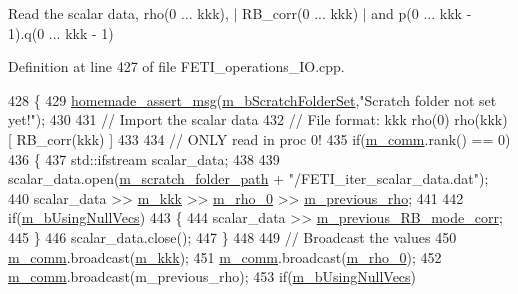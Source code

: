 Read the scalar data, {\ttfamily rho(0 ... kkk)}, {\ttfamily $\vert$ R\+B\+\_\+corr(0 ... kkk) $\vert$} and {\ttfamily p(0 ... kkk -\/ 1).q(0 ... kkk -\/ 1)} 



Definition at line 427 of file F\+E\+T\+I\+\_\+operations\+\_\+\+I\+O.\+cpp.


\begin{DoxyCode}
428 \{
429     \hyperlink{common__header_8h_a593ccc80b790b2268653fcf6597bf451}{homemade\_assert\_msg}(\hyperlink{classcarl_1_1_f_e_t_i___operations_a8bb9de7de35a2f7d7d5982ae1085ba15}{m\_bScratchFolderSet},\textcolor{stringliteral}{"Scratch folder not set
       yet!"});
430 
431     \textcolor{comment}{// Import the scalar data}
432     \textcolor{comment}{// File format:  kkk   rho(0)   rho(kkk)   [ RB\_corr(kkk) ]}
433 
434     \textcolor{comment}{// ONLY read in proc 0!}
435     \textcolor{keywordflow}{if}(\hyperlink{classcarl_1_1_f_e_t_i___operations_a8cb0ed286667fc9f3ebc2d8ef2a3e13b}{m\_comm}.rank() == 0)
436     \{
437         std::ifstream scalar\_data;
438 
439         scalar\_data.open(\hyperlink{classcarl_1_1_f_e_t_i___operations_ad6d35bc9b5221d45452fbc8931f22055}{m\_scratch\_folder\_path} + \textcolor{stringliteral}{"/FETI\_iter\_scalar\_data.dat"});
440         scalar\_data >> \hyperlink{classcarl_1_1_f_e_t_i___operations_aae9d8e6d2d0436cda061359f1602b096}{m\_kkk} >> \hyperlink{classcarl_1_1_f_e_t_i___operations_a7d44cceb8c3e003f9e8c22972602fcc8}{m\_rho\_0} >> \hyperlink{classcarl_1_1_f_e_t_i___operations_af0ebbbb10b8e989a9fc4b3b20c7a2478}{m\_previous\_rho};
441 
442         \textcolor{keywordflow}{if}(\hyperlink{classcarl_1_1_f_e_t_i___operations_aff68699ccceb6e1debc4ecab97dde2ff}{m\_bUsingNullVecs})
443         \{
444             scalar\_data >> \hyperlink{classcarl_1_1_f_e_t_i___operations_ae13cf11dfb8dd3a55742b06d96e0e941}{m\_previous\_RB\_mode\_corr};
445         \}
446         scalar\_data.close();
447     \}
448 
449     \textcolor{comment}{// Broadcast the values}
450     \hyperlink{classcarl_1_1_f_e_t_i___operations_a8cb0ed286667fc9f3ebc2d8ef2a3e13b}{m\_comm}.broadcast(\hyperlink{classcarl_1_1_f_e_t_i___operations_aae9d8e6d2d0436cda061359f1602b096}{m\_kkk});
451     \hyperlink{classcarl_1_1_f_e_t_i___operations_a8cb0ed286667fc9f3ebc2d8ef2a3e13b}{m\_comm}.broadcast(\hyperlink{classcarl_1_1_f_e_t_i___operations_a7d44cceb8c3e003f9e8c22972602fcc8}{m\_rho\_0});
452     \hyperlink{classcarl_1_1_f_e_t_i___operations_a8cb0ed286667fc9f3ebc2d8ef2a3e13b}{m\_comm}.broadcast(m\_previous\_rho);
453     \textcolor{keywordflow}{if}(\hyperlink{classcarl_1_1_f_e_t_i___operations_aff68699ccceb6e1debc4ecab97dde2ff}{m\_bUsingNullVecs})

\end{DoxyCode}
